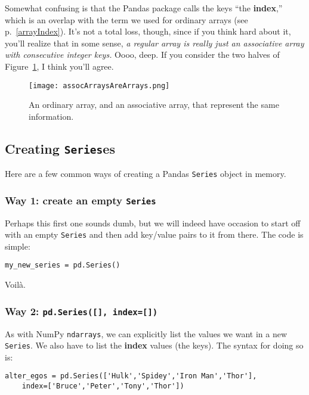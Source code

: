 Somewhat confusing is that the Pandas package calls the keys ``the
\textbf{index},'' which is an overlap with the term we used for ordinary arrays
(see p.~\ref{arrayIndex}). It's not a total loss, though, since if you think
hard about it, you'll realize that in some sense, \textit{a regular array is
really just an associative array with consecutive integer keys.} Oooo, deep. If
you consider the two halves of Figure~\ref{fig:assocArraysAreArrays}, I think
you'll agree.

\begin{figure}[ht]
\centering
\texttt{[image: assocArraysAreArrays.png]}
\caption{An ordinary array, and an associative array, that represent the same
information.}
\label{fig:assocArraysAreArrays}
\end{figure}


\subsection{Creating \texttt{Series}es}

Here are a few common ways of creating a Pandas \texttt{Series} object in
memory.

\subsubsection{Way 1: create an empty \texttt{Series}}

Perhaps this first one sounds dumb, but we will indeed have occasion to start
off with an empty \texttt{Series} and then add key/value pairs to it from
there. The code is simple:

\begin{Verbatim}[fontsize=\small,samepage=true,frame=single,framesep=3mm]
my_new_series = pd.Series()
\end{Verbatim}

Voil\`{a}.

\subsubsection{Way 2: \texttt{pd.Series([], index=[])}}

As with NumPy \texttt{ndarrays}, we can explicitly list the values we want in a
new \texttt{Series}. We also have to list the \textbf{index} values (the keys).
The syntax for doing so is:

\label{marvelSeries}

\begin{Verbatim}[fontsize=\small,samepage=true,frame=single,framesep=3mm]
alter_egos = pd.Series(['Hulk','Spidey','Iron Man','Thor'],
    index=['Bruce','Peter','Tony','Thor'])
\end{Verbatim}

